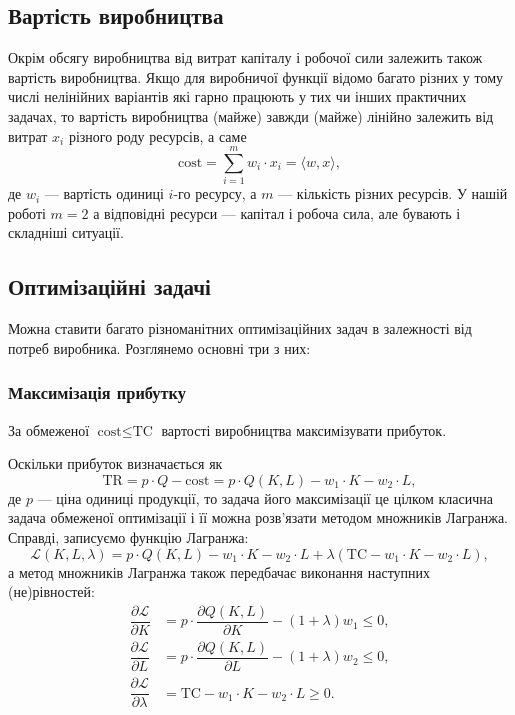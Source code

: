 \subsection{Вартість виробництва}

Окрім обсягу виробництва від витрат капіталу і робочої сили залежить також вартість виробництва. Якщо для виробничої функції відомо багато різних у тому числі нелінійних варіантів які гарно працюють у тих чи інших практичних задачах, то вартість виробництва (майже) завжди (майже) лінійно залежить від витрат $x_i$ різного роду ресурсів, а саме
\[ \text{cost} = \sum_{i = 1}^m w_i \cdot x_i = \langle w, x \rangle, \] 
де $w_i$ --- вартість одиниці $i$-го ресурсу, а $m$ --- кількість різних ресурсів. У нашій роботі $m = 2$ а відповідні ресурси --- капітал і робоча сила, але бувають і складніші ситуації. 

\subsection{Оптимізаційні задачі}

Можна ставити багато різноманітних оптимізаційних задач в залежності від потреб виробника. Розглянемо основні три з них:

\subsubsection{Максимізація прибутку}

За обмеженої $\text{cost} \le \text{TC}$ вартості виробництва максимізувати прибуток. \medskip

Оскільки прибуток визначається як 
\[\text{TR} = p \cdot Q - \text{cost} = p \cdot Q(K, L) - w_1 \cdot K - w_2 \cdot L,\]
де $p$ --- ціна одиниці продукції, то задача його максимізації це цілком класична задача обмеженої оптимізації і її можна розв'язати методом множників Лагранжа. Справді, записуємо функцію Лагранжа:
\[ \mathcal{L}(K, L, \lambda) = p \cdot Q(K, L) - w_1 \cdot K - w_2 \cdot L + \lambda (\text{TC} - w_1 \cdot K - w_2 \cdot L),\]
а метод множників Лагранжа також передбачає виконання наступних (не)рівностей:
\begin{align*}
	\dfrac{\partial \mathcal{L}}{\partial K} &= p \cdot \dfrac{\partial Q(K, L)}{\partial K} - (1 + \lambda) w_1 \le 0, \\
	\dfrac{\partial \mathcal{L}}{\partial L} &= p \cdot \dfrac{\partial Q(K, L)}{\partial L} - (1 + \lambda) w_2 \le 0, \\
	\dfrac{\partial \mathcal{L}}{\partial \lambda} &= \text{TC} - w_1 \cdot K - w_2 \cdot L \ge 0.
\end{align*}


